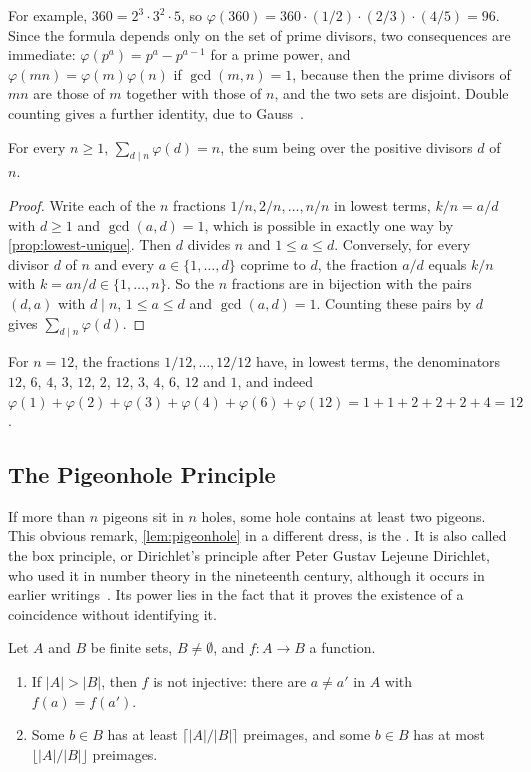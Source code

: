 For example, $360=2^3\cdot3^2\cdot5$, so $\varphi(360)=360\cdot(1/2)\cdot(2/3)\cdot(4/5)=96$. Since the formula depends only on the set of prime divisors, two consequences are immediate: $\varphi(p^a)=p^a-p^{a-1}$ for a prime power, and $\varphi(mn)=\varphi(m)\varphi(n)$ if $\gcd(m,n)=1$, because then the prime divisors of $mn$ are those of $m$ together with those of $n$, and the two sets are disjoint. Double counting gives a further identity, due to Gauss~\cite{gauss1801,hardywright2008}.

\begin{proposition}
\label{prop:gauss-phi}
For every $n\ge1$, $\sum_{d\mid n}\varphi(d)=n$, the sum being over the positive divisors $d$ of $n$.
\end{proposition}

\begin{proof}
Write each of the $n$ fractions $1/n,2/n,\ldots,n/n$ in lowest terms, $k/n=a/d$ with $d\ge1$ and $\gcd(a,d)=1$, which is possible in exactly one way by \cref{prop:lowest-unique}. Then $d$ divides $n$ and $1\le a\le d$. Conversely, for every divisor $d$ of $n$ and every $a\in\{1,\ldots,d\}$ coprime to $d$, the fraction $a/d$ equals $k/n$ with $k=an/d\in\{1,\ldots,n\}$. So the $n$ fractions are in bijection with the pairs $(d,a)$ with $d\mid n$, $1\le a\le d$ and $\gcd(a,d)=1$. Counting these pairs by $d$ gives $\sum_{d\mid n}\varphi(d)$.
\end{proof}

For $n=12$, the fractions $1/12,\ldots,12/12$ have, in lowest terms, the denominators $12$, $6$, $4$, $3$, $12$, $2$, $12$, $3$, $4$, $6$, $12$ and $1$, and indeed $\varphi(1)+\varphi(2)+\varphi(3)+\varphi(4)+\varphi(6)+\varphi(12)=1+1+2+2+2+4=12$.

\subsection{The Pigeonhole Principle}

If more than $n$ pigeons sit in $n$ holes, some hole contains at least two pigeons. This obvious remark, \cref{lem:pigeonhole} in a different dress, is the . It is also called the box principle, or Dirichlet's principle after Peter Gustav Lejeune Dirichlet, who used it in number theory in the nineteenth century, although it occurs in earlier writings~\cite{rittaud2014pigeonhole}. Its power lies in the fact that it proves the existence of a coincidence without identifying it.

\begin{theorem}
\label{thm:pigeonhole}
Let $A$ and $B$ be finite sets, $B\ne\emptyset$, and $f\colon A\to B$ a function.
\begin{enumerate}
\item If $|A|>|B|$, then $f$ is not injective: there are $a\ne a'$ in $A$ with $f(a)=f(a')$.
\item Some $b\in B$ has at least $\lceil|A|/|B|\rceil$ preimages, and some $b\in B$ has at most $\lfloor|A|/|B|\rfloor$ preimages.
\end{enumerate}
\end{theorem}

